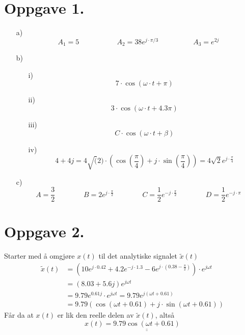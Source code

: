 \documentclass[a4paper,11pt,norsk]{article}
\begin{document}


\section*{Oppgave 1.}
\begin{itemize}[label=\alph)]
    \item[a)] {
        \[
            A_1 = 5 \:\:\:\:\:\:\:\:\:\:\:\:\:\:\:\:\:\:\:\:\:\:\:\: A_2 = 38e^{j \cdot \pi/3} \:\:\:\:\:\:\:\:\:\:\:\:\:\:\:\:\:\:\:\:\:\: A_3 = e^{2j}
        \]
    } 
    \item[b)] {
        \begin{itemize}
            \item[i)] {
                \[
                    7 \cdot \cos{\left(\omega \cdot t + \pi\right)}
                \]
            }
            \item[ii)] {
                \[
                    3 \cdot \cos{\left(\omega \cdot t + 4.3\pi\right)}
                \]
            }
            \item[iii)] {
                \[
                    C \cdot \cos{\left(\omega \cdot t + \beta\right)}
                \]
            }
            \item[iv)] {
                \[
                    4+4j = 4\sqrt(2) \cdot \left(\cos{\left(\frac{\pi}{4}\right) + j \cdot \sin{\left(\frac{\pi}{4}\right)}}\right) = 4\sqrt{2}e^{j \cdot \frac{\pi}{4}}
                \]
            }
        \end{itemize}
    }
    \item[c)] {
        \[
            A = \frac{3}{2} \:\:\:\:\:\:\:\:\:\:\:\:\:\:\:\:\:\: B = 2e^{j \cdot \frac{\pi}{2}} \:\:\:\:\:\:\:\:\:\:\:\:\:\:\:\:\:\: C = \frac{1}{2}e^{-j \cdot \frac{\pi}{2}} \:\:\:\:\:\:\:\:\:\:\:\:\:\:\:\:\:\: D = \frac{1}{2}e^{-j \cdot \pi}
        \]
    }
\end{itemize}

\section*{Oppgave 2.}
Starter med å omgjøre $x(t)$ til det analytiske signalet $\tilde{x}(t)$
\begin{align*}
    \tilde{x}(t) &= \left(10e^{j \cdot 0.42} + 4.2e^{-j \cdot 1.3} - 6e^{j \cdot \left(0.38 - \frac{\pi}{2}\right)}\right) \cdot e^{j \omega t} \\ 
                 &= \left(8.03 + 5.6j\right)e^{j \omega t} \\ 
                 &= 9.79e^{0.61j} \cdot e^{j \omega t} = 9.79e^{j\left(\omega t + 0.61\right)} \\
                 &= 9.79(\cos{\left(\omega t + 0.61\right)} + j \cdot \sin{\left(\omega t + 0.61\right)})
\end{align*}
Får da at $x(t)$ er lik den reelle delen av $\tilde{x}(t)$, altså
\[
    x(t) = \underline{\underline{9.79\cos{\left(\omega t + 0.61\right)}}}
\]
\end{document}

